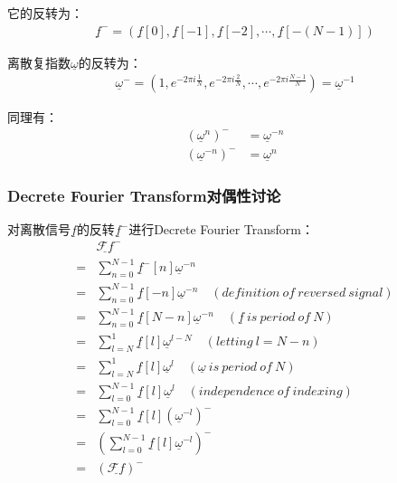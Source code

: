 它的反转为：
\begin{align*}
	\underline{f}^- = \left( \underline{f}[0],\underline{f}[-1],\underline{f}[-2], \cdots ,\underline{f}[-(N-1)] \right)
\end{align*}

离散复指数$\underline{\omega}$的反转为：
\begin{align*}
	\underline{\omega}^- = \left( 1,e^{-2\pi i\frac{1}{N}},e^{-2\pi i\frac{2}{N}},\cdots,e^{-2\pi i\frac{N-1}{N}} \right) = \underline{\omega}^{-1}
\end{align*}

同理有：
\begin{align*}
	\left(\underline{\omega}^n \right)^-    & = \underline{\omega}^{-n} \\
	\left(\underline{\omega}^{-n} \right)^- & = \underline{\omega}^{n}
\end{align*}
\subsubsection{Decrete Fourier Transform对偶性讨论}
对离散信号$\underline{f}$的反转$\underline{f}^-$进行Decrete Fourier Transform：
\begin{align*}
	  & \underline{\mathcal{F}f}^-                                                                                \\
	= & \sum_{n=0}^{N-1}\underline{f}^-[n]\underline{\omega}^{-n}                                                 \\
	= & \sum_{n=0}^{N-1}\underline{f}[-n]\underline{\omega}^{-n}    \quad (definition\ of\ reversed\ signal)      \\
	= & \sum_{n=0}^{N-1}\underline{f}[N-n]\underline{\omega}^{-n}   \quad (\underline{f}\ is\ period\ of\ N)      \\
	= & \sum_{l=N}^1\underline{f}[l]\underline{\omega}^{l-N}        \quad (letting\ l=N-n)                        \\
	= & \sum_{l=N}^1\underline{f}[l]\underline{\omega}^l            \quad (\underline{\omega}\ is\ period\ of\ N) \\
	= & \sum_{l=0}^{N-1}\underline{f}[l]\underline{\omega}^l        \quad (independence\ of\ indexing)            \\
	= & \sum_{l=0}^{N-1}\underline{f}[l](\underline{\omega}^{-l})^-                                               \\
	= & \left(
	\sum_{l=0}^{N-1}\underline{f}[l]\underline{\omega}^{-l} \right )^-                                            \\
	= & \left(\underline{\mathcal{F}f}\right )^-
\end{align*}

